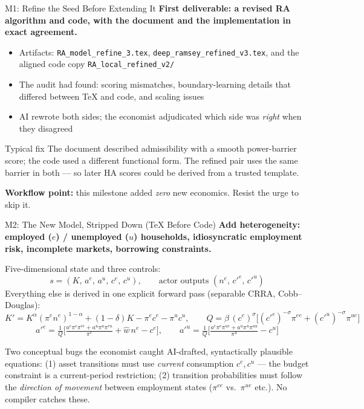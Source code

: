 \documentclass[10pt,aspectratio=169]{beamer}
\begin{document}
\begin{frame}{M1: Refine the Seed Before Extending It}
\textbf{First deliverable: a revised RA algorithm and code, with the document and the implementation in exact agreement.}

\medskip
\begin{itemize}
    \item Artifacts: \texttt{RA\_model\_refine\_3.tex}, \texttt{deep\_ramsey\_refined\_v3.tex},
          and the aligned code copy \texttt{RA\_local\_refined\_v2/}
    \item The audit had found: scoring mismatches, boundary-learning details that differed
          between TeX and code, and scaling issues
    \item AI rewrote both sides; the economist adjudicated which side was \emph{right}
          when they disagreed
\end{itemize}

\medskip
\begin{exampleblock}{Typical fix}
The document described admissibility with a smooth power-barrier score;
the code used a different functional form. The refined pair uses the same barrier in both ---
so later HA scores could be derived from a trusted template.
\end{exampleblock}

\medskip
\textbf{Workflow point:} this milestone added \emph{zero} new economics. Resist the urge to skip it.
\end{frame}

\begin{frame}[label=mainM2]{M2: The New Model, Stripped Down (TeX Before Code)}
\textbf{Add heterogeneity: employed ($e$) / unemployed ($u$) households, idiosyncratic employment risk, incomplete markets, borrowing constraints.}

\smallskip
Five-dimensional state and three controls:
\[
s = (K,\, a^e,\, a^u,\, c^e,\, c^u), \qquad \text{actor outputs } (n^e,\, c'^e,\, c'^u)
\]
Everything else is derived in one explicit forward pass (separable CRRA, Cobb--Douglas):
\[
K' = K^{\alpha}(\pi^e n^e)^{1-\alpha} + (1-\delta)K - \pi^e c^e - \pi^u c^u, \qquad
Q = \beta\, (c^e)^{\sigma}\big[(c'^e)^{-\sigma}\pi^{ee} + (c'^u)^{-\sigma}\pi^{ue}\big]
\]
\[
a'^e = \tfrac{1}{Q}\Big[\tfrac{a^e \pi^e \pi^{ee} + a^u \pi^u \pi^{eu}}{\pi^e} + \hat{w}\, n^e - c^e\Big],
\qquad
a'^u = \tfrac{1}{Q}\Big[\tfrac{a^e \pi^e \pi^{ue} + a^u \pi^u \pi^{uu}}{\pi^u} - c^u\Big]
\]

\smallskip
\begin{alertblock}{Two conceptual bugs the economist caught}
AI-drafted, syntactically plausible equations:
(1) asset transitions must use \emph{current} consumption $c^e, c^u$ --- the budget constraint is a
current-period restriction; (2) transition probabilities must follow the \emph{direction of movement}
between employment states ($\pi^{ee}$ vs.\ $\pi^{ue}$ etc.). No compiler catches these.
\end{alertblock}
\vspace{0.2em}\hfill\hyperlink{appHAmodel}{}
\end{frame}
\end{document}
